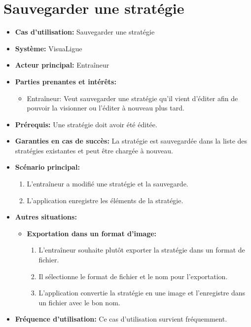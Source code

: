 \section{Sauvegarder une stratégie}
\label{sec:exporter_une_strategie}
\begin{itemize}
    \item \textbf{Cas d'utilisation:} Sauvegarder une strat\'egie
    \item \textbf{Syst\`eme:} VisuaLigue
    \item \textbf{Acteur principal:} Entra\^ineur
    \item \textbf{Parties prenantes et int\'er\^ets:}
        \begin{itemize}
            \item Entraîneur: Veut sauvegarder une stratégie qu'il vient d'éditer afin de pouvoir la visionner ou l'éditer à nouveau plus tard.
        \end{itemize}
    \item \textbf{Pr\'erequis:} Une stratégie doit avoir été éditée.
    \item \textbf{Garanties en cas de succ\`es:} La stratégie est sauvegardée dans la liste des stratégies existantes et peut être chargée à nouveau.
    \item \textbf{Sc\'enario principal:}
        \begin{enumerate}
            \item L'entra\^ineur a modifié une strat\'egie et la sauvegarde.
            \item L'application enregistre les \'el\'ements de la strat\'egie.
        \end{enumerate}
    \item \textbf{Autres situations:}
        \begin{itemize}
            \item \textbf{Exportation dans un format d'image:}
                \begin{enumerate}
                    \item L'entra\^ineur souhaite plut\^ot exporter la strat\'egie dans un format de fichier.
                    \item Il s\'electionne le format de fichier et le nom pour l'exportation.
                    \item L'application convertie la strat\'egie en une image et l'enregistre dans un fichier avec le bon nom.
                \end{enumerate}
        \end{itemize}
    \item \textbf{Fréquence d'utilisation:} Ce cas d'utilisation survient fréquemment.
\end{itemize}



